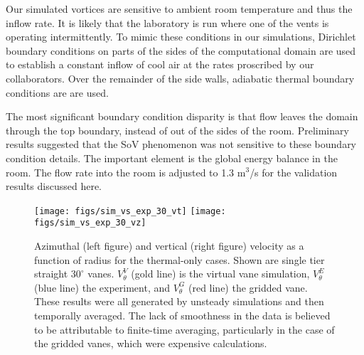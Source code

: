 Our simulated vortices are sensitive to ambient room temperature and thus 
the inflow rate. It is likely that the laboratory is run where one of
the vents is operating intermittently. 
To mimic these conditions in our simulations, Dirichlet boundary conditions 
on parts of the sides of the computational domain are used to
establish a constant inflow of cool air at the rates 
proscribed by our collaborators. Over the remainder of the side walls, 
adiabatic thermal boundary conditions are are used. 

The most significant boundary condition disparity is that flow leaves the
domain through the top boundary, instead of out of the sides of the
room. Preliminary results suggested that the SoV phenomenon  was not
sensitive to these boundary condition details. The important element is
the  global energy balance in the room. The flow rate into the room is
adjusted to  1.3 $\text{m}^3$/s for the validation results discussed here.  


\begin{figure}[htp!]

  \centering
  \texttt{[image: figs/sim\_vs\_exp\_30\_vt]}
 \hfill
 \texttt{[image: figs/sim\_vs\_exp\_30\_vz]}%
 \caption{Azimuthal (left figure) and vertical (right figure) velocity 
 as a function of radius for the thermal-only cases. Shown are single
 tier straight $30^{\circ}$ vanes. $V_{\theta}^V$ (gold line) is
 the virtual vane simulation, $V_{\theta}^E$ (blue line) the experiment,
 and $V_{\theta}^G$ (red line) the gridded vane. These results were all
 generated by unsteady simulations and then temporally averaged. 
 The lack of smoothness in the data is believed to be
 attributable to finite-time averaging, particularly in the case of the
 gridded vanes, which were expensive calculations. }   
 \label{fig:val_lab}  
\end{figure}

